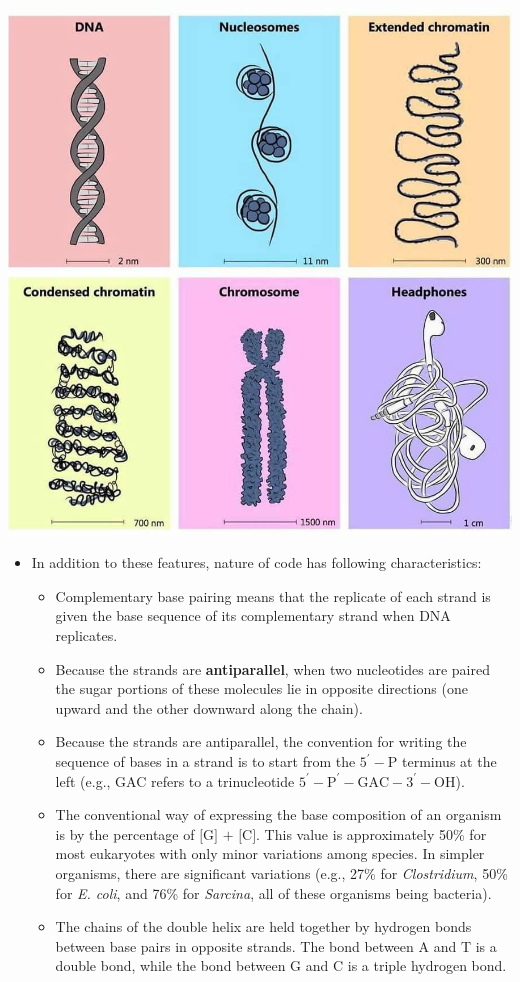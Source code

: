 \documentclass[11pt,ignorenonframetext,aspectratio=169]{beamer}
\providecommand{\tightlist}{%
  \setlength{\itemsep}{0pt}\setlength{\parskip}{0pt}}
\begin{document}
\begin{frame}{}
\protect\hypertarget{section-4}{}
\begin{center}\includegraphics[width=0.58\linewidth]{../images/headphonome} \end{center}
\end{frame}

\begin{frame}{}
\protect\hypertarget{section-5}{}
\begin{itemize}
\tightlist
\item
  In addition to these features, nature of code has following
  characteristics:

  \begin{itemize}
  \tightlist
  \item
    Complementary base pairing means that the replicate of each strand
    is given the base sequence of its complementary strand when DNA
    replicates.
  \item
    Because the strands are \textbf{antiparallel}, when two nucleotides
    are paired the sugar portions of these molecules lie in opposite
    directions (one upward and the other downward along the chain).
  \item
    Because the strands are antiparallel, the convention for writing the
    sequence of bases in a strand is to start from the
    \(\mathrm{5^{\prime}-P}\) terminus at the left (e.g., GAC refers to
    a trinucleotide \(\mathrm{5^\prime-P^{\prime}-GAC-3^\prime-OH}\)).
  \item
    The conventional way of expressing the base composition of an
    organism is by the percentage of \(\text{[G] + [C]}\). This value is
    approximately 50\% for most eukaryotes with only minor variations
    among species. In simpler organisms, there are significant
    variations (e.g., 27\% for \emph{Clostridium}, 50\% for \emph{E.
    coli}, and 76\% for \emph{Sarcina}, all of these organisms being
    bacteria).
  \item
    The chains of the double helix are held together by hydrogen bonds
    between base pairs in opposite strands. The bond between A and T is
    a double bond, while the bond between G and C is a triple hydrogen
    bond.
  \end{itemize}
\end{itemize}
\end{frame}
\end{document}
